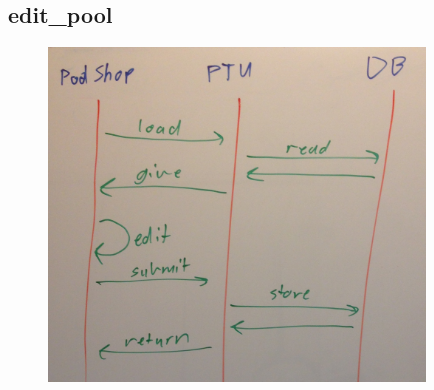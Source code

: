 \subsection{edit\_pool}
\begin{figure}[!ht]
\begin{center}
	\includegraphics[width=10cm]{images/edit_pool}
	\caption{}
\end{center}
\end{figure}